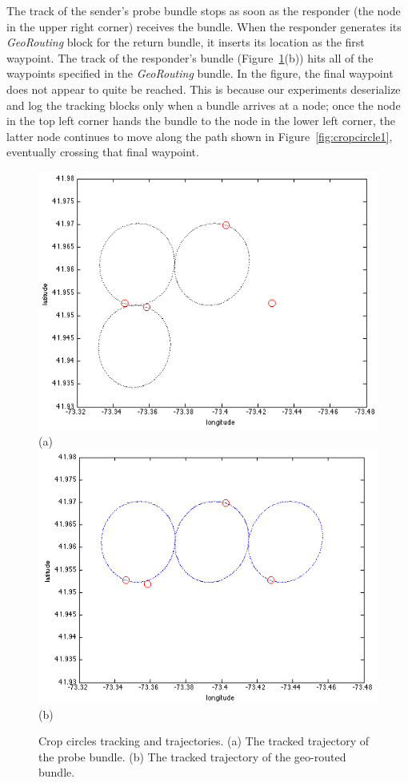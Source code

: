 The track of the sender's probe bundle stops as soon as the responder
(the node in the upper right corner) receives the bundle. When the
responder generates its {\em GeoRouting} block for the return bundle,
it inserts its location as the first waypoint. The track of the
responder's bundle (Figure~\ref{fig:cropCirclesExperiment}(b)) hits
all of the waypoints specified in the {\em GeoRouting} bundle. In the
figure, the final waypoint does not appear to quite be reached. This
is because our experiments deserialize and log the tracking blocks
only when a bundle arrives at a node; once the node in the top left
corner hands the bundle to the node in the lower left corner, the
latter node continues to move along the path shown in
Figure~\ref{fig:cropcircle1}, eventually crossing that final waypoint.
\begin{figure}[!h]
\begin{center}
\includegraphics[width=.8\columnwidth]{figures/CropCirclesExperiment2.png}\\
(a)\\
\includegraphics[width=.8\columnwidth]{figures/CropCirclesExperiment.png}\\
(b)\\
\end{center}
\vspace{-.5cm}
\caption{Crop circles tracking and trajectories. (a) The tracked
  trajectory of the probe bundle. (b) The tracked trajectory of the
  geo-routed bundle.}
\label{fig:cropCirclesExperiment}
\vspace{-.25cm}
\end{figure}


